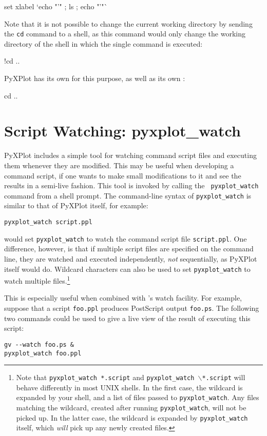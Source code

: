 \begin{dodo}
set xlabel `echo "'" ; ls ; echo "'"`
\end{dodo}

Note that it is not possible to change the current working directory by sending
the {\tt cd} command to a shell, as this command would only change the working
directory of the shell in which the single command is executed:

\begin{dontdo}
!cd ..
\end{dontdo}

\noindent PyXPlot has its own  for this purpose, as well as its own
:

\begin{dodo}
cd ..
\end{dodo}

\section{Script Watching: pyxplot\_watch}

PyXPlot includes a simple tool for watching command script files and executing
them whenever they are modified. This may be useful when developing a command
script, if one wants to make small modifications to it and see the results in a
semi-live fashion. This tool is invoked by calling the {\tt
pyxplot\_watch} command from a
shell prompt. The command-line syntax of {\tt pyxplot\_watch} is similar to
that of PyXPlot itself, for example:

\begin{verbatim}
pyxplot_watch script.ppl
\end{verbatim}

\noindent would set {\tt pyxplot\_watch} to watch the command script file
{\tt script.ppl}. One difference, however, is that if multiple script files are
specified on the command line, they are watched and executed independently,
\textit{not} sequentially, as PyXPlot itself would do. Wildcard characters can
also be used to set {\tt pyxplot\_watch} to watch multiple
files.\footnote{Note that {\tt pyxplot\_watch *.script} and
{\tt pyxplot\_watch $\backslash$*.script} will behave differently in most
UNIX shells.  In the first case, the wildcard is expanded by your shell, and a
list of files passed to {\tt pyxplot\_watch}. Any files matching the
wildcard, created after running {\tt pyxplot\_watch}, will not be picked up.
In the latter case, the wildcard is expanded by {\tt pyxplot\_watch} itself,
which {\it will} pick up any newly created files.}

This is especially useful when combined with \ghostview's
watch facility. For example, suppose that a script {\tt foo.ppl} produces
PostScript output {\tt foo.ps}. The following two commands could be used to
give a live view of the result of executing this script:

\begin{verbatim}
gv --watch foo.ps &
pyxplot_watch foo.ppl
\end{verbatim}

